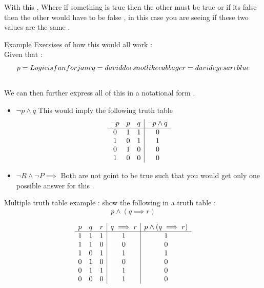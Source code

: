 \documentclass{article}
\theoremstyle{mytheoremstyle}
\theoremstyle{mytheoremstyle}
\theoremstyle{myproblemstyle}
\begin{document}
With this , Where if something is true then the other must be true or if its false then the other would have to be false , in this case you are seeing if these two values are the same .

Example Exersises of how this would all work :
\\
Given that :
\[p = Logic is fun for jane \\ \\
	q = david does not like cabbage \\ \\
	r = david eyes are blue \]\\

We can then further express all of this in a notational form .
\begin{itemize}
	\item $\neg p \land q$
	      This would imply the following truth table
	      \[\begin{array}{c c c | c }
			      \neg p & p & q & \neg p \land q \\
			      \hline
			      0      & 1 & 1 & 0              \\
			      1      & 0 & 1 & 1              \\
			      0      & 1 & 0 & 0              \\
			      1      & 0 & 0 & 0
		      \end{array}\]
	\item $\neg R \land \neg P \implies$  Both are not goint to be true such that you would get only one possible answer for this  .
\end{itemize}


Multiple truth table example :
show the following in a truth table :
\\
\[p \land (q \implies r) \]

\[\begin{array}{c c c | c | c }
		p & q & r & q \implies r & p \land (q \implies r) \\
		\hline
		1 & 1 & 1 & 1            & 1                      \\
		1 & 1 & 0 & 0            & 0                      \\
		1 & 0 & 1 & 1            & 1                      \\
		0 & 1 & 0 & 0            & 0                      \\
		0 & 1 & 1 & 1            & 0                      \\
		0 & 0 & 0 & 1            & 0                      \\
	\end{array}\]
\end{document}
